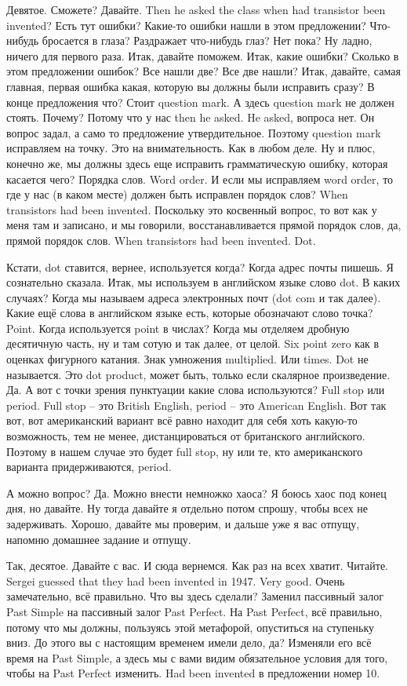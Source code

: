 \documentclass[main.tex]{subfiles}
\begin{document}
Девятое.
Сможете? Давайте.
Then he asked the class when had transistor been invented?
Есть тут ошибки?
Какие-то ошибки нашли в этом предложении?
Что-нибудь бросается в глаза?
Раздражает что-нибудь глаз?
Нет пока?
Ну ладно, ничего для первого раза.
Итак, давайте поможем.
Итак, какие ошибки?
Сколько в этом предложении ошибок?
Все нашли две?
Все две нашли?
Итак, давайте, самая главная, первая ошибка какая, которую вы должны были исправить сразу?
В конце предложения что?
Стоит question mark.
А здесь question mark не должен стоять.
Почему?
Потому что у нас then he asked.
He asked, вопроса нет.
Он вопрос задал, а само то предложение утвердительное.
Поэтому question mark исправляем на точку.
Это на внимательность.
Как в любом деле.
Ну и плюс, конечно же, мы должны здесь еще исправить грамматическую ошибку, которая касается чего?
Порядка слов.
Word order.
И если мы исправляем word order, то где у нас (в каком месте) должен быть исправлен порядок слов?
When transistors had been invented.
Поскольку это косвенный вопрос, то вот как у меня там и записано, и мы говорили, восстанавливается прямой порядок слов, да, прямой порядок слов.
When transistors had been invented. Dot.

Кстати, dot ставится, вернее, используется когда?
Когда адрес почты пишешь.
Я сознательно сказала.
Итак, мы используем в английском языке слово dot.
В каких случаях?
Когда мы называем адреса электронных почт (dot com и так далее).
Какие ещё слова в английском языке есть, которые обозначают слово точка?
Point.
Когда используется point в числах?
Когда мы отделяем дробную десятичную часть, ну и там сотую и так далее, от целой.
Six point zero как в оценках фигурного катания.
Знак умножения multiplied.
Или times.
Dot не называется.
Это dot product, может быть, только если скалярное произведение.
Да.
А вот с точки зрения пунктуации какие слова используются?
Full stop или period.
Full stop -- это British English, period -- это American English.
Вот так вот, вот американский вариант всё равно находит для себя хоть какую-то возможность, тем не менее, дистанцироваться от британского английского.
Поэтому в нашем случае это будет full stop, ну или те, кто американского варианта придерживаются, period.

А можно вопрос? Да.
Можно внести немножко хаоса?
Я боюсь хаос под конец дня, но давайте.
Ну тогда давайте я отдельно потом спрошу, чтобы всех не задерживать.
Хорошо, давайте мы проверим, и дальше уже я вас отпущу, напомню домашнее задание и отпущу.

Так, десятое.
Давайте с вас.
И сюда вернемся.
Как раз на всех хватит.
Читайте.
Sergei guessed that they had been invented in 1947.
Very good.
Очень замечательно, всё правильно.
Что вы здесь сделали?
Заменил пассивный залог Past Simple на пассивный залог Past Perfect.
На Past Perfect, всё правильно, потому что мы должны, пользуясь этой метафорой, опуститься на ступеньку вниз.
До этого вы с настоящим временем имели дело, да?
Изменяли его всё время на Past Simple, а здесь мы с вами видим обязательное условия для того, чтобы на Past Perfect изменить.
Had been invented в предложении номер 10.
\end{document}
